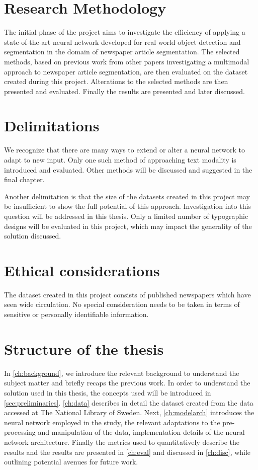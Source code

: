 \documentclass[english, bibtex]{kththesis}
\begin{document}
\section{Research Methodology}

The initial phase of the project aims to investigate the efficiency of applying a state-of-the-art neural network developed for real world object detection and segmentation in the domain of newspaper article segmentation. The selected methods, based on previous work from other papers investigating a multimodal approach to newspaper article segmentation, are then evaluated on the dataset created during this project. Alterations to the selected methods are then presented and evaluated. Finally the results are presented and later discussed.

\section{Delimitations}

We recognize that there are many ways to extend or alter a neural network to adapt to new input. Only one such method of approaching text modality is introduced and evaluated. Other methods will be discussed and suggested in the final chapter. 

Another delimitation is that the size of the datasets created in this project may be insufficient to show the full potential of this approach. Investigation into this question will be addressed in this thesis. Only a limited number of typographic designs will be evaluated in this project, which may impact the generality of the solution discussed.

\section{Ethical considerations}

The dataset created in this project consists of published newspapers which have seen wide circulation. No special consideration needs to be taken in terms of sensitive or personally identifiable information.   

\section{Structure of the thesis}

In \autoref{ch:background}, we introduce the relevant background to understand the subject matter and briefly recaps the previous work. In order to understand the solution used in this thesis, the concepts used will be introduced in \autoref{sec:preliminaries}. \autoref{ch:data} describes in detail the dataset created from the data accessed at The National Library of Sweden.  Next, \autoref{ch:modelarch} introduces the neural network employed in the study, the relevant adaptations to the pre-processing and manipulation of the data, implementation details of the neural network architecture. Finally the metrics used to quantitatively describe the results and the results are presented in \autoref{ch:eval} and discussed in \autoref{ch:disc}, while outlining potential avenues for future work.
\end{document}
